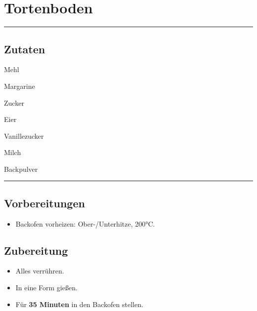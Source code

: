 \section*{Tortenboden}

\bigbreak
\rule{\textwidth}{0.4pt}

\subsection*{Zutaten}

\begin{description}[align=right,leftmargin=!,labelwidth=\widthof{\bfseries xxPrisen}]
    \item[200g] Mehl
    \item[125g] Margarine
    \item[100g] Zucker
    \item[2] Eier
    \item[1 Pkg] Vanillezucker
    \item[1 EL] Milch
    \item[$\frac{1}{2}$ TL] Backpulver
\end{description}


\rule{\textwidth}{0.4pt}


\subsection*{Vorbereitungen}

\begin{itemize}
    \item Backofen vorheizen: Ober-/Unterhitze, 200°C.
\end{itemize}


\bigbreak
\subsection*{Zubereitung}

\begin{itemize}
    \item Alles verrühren.
    \item In eine Form gießen.
    \item Für \textbf{35 Minuten} in den Backofen stellen.
\end{itemize}
